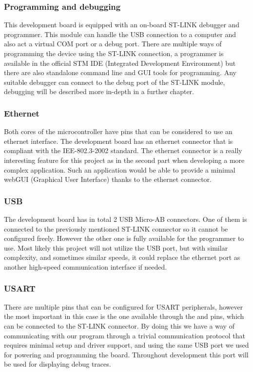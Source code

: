 \subsubsection{Programming and debugging}

This development board is equipped with an on-board ST-LINK debugger and programmer. This module can handle the USB connection to a computer and also act a virtual COM port or a debug port. There are multiple ways of programming the device using the ST-LINK connection, a programmer is available in the official STM IDE (Integrated Development Environment) but there are also standalone command line and GUI tools for programming. Any suitable debugger can connect to the debug port of the ST-LINK module, debugging will be described more in-depth in a further chapter.

\subsubsection{Ethernet}

Both cores of the microcontroller have pins that can be considered to use an ethernet interface. The development board has an ethernet connector that is compliant with the IEE-802.3-2002 standard. The ethernet connector is a really interesting feature for this project as in the second part when developing a more complex application. Such an application would be able to provide a minimal webGUI (Graphical User Interface) thanks to the ethernet connector.

\subsubsection{USB}

The development board has in total 2 USB Micro-AB connectors. One of them is connected to the previously mentioned ST-LINK connector so it cannot be configured freely. However the other one is fully available for the programmer to use. Most likely this project will not utilize the USB port, but with similar complexity, and sometimes similar speeds, it could replace the ethernet port as another high-speed communication interface if needed.

\subsubsection{USART}

There are multiple pins that can be configured for USART peripherals, however the most important in this case is the one available through the  and  pins, which can be connected to the ST-LINK connector. By doing this we have a way of communicating with our program through a trivial communication protocol that requires minimal setup and driver support, and using the same USB port we used for powering and programming the board. Throughout development this port will be used for displaying debug traces.

